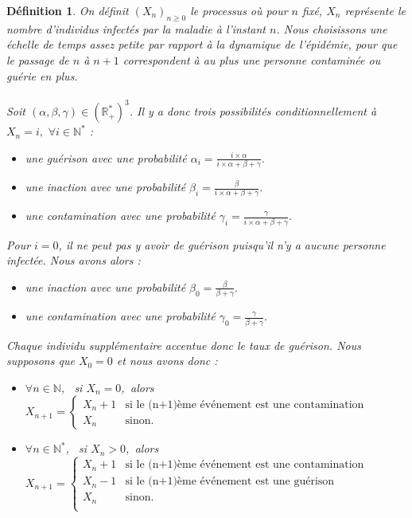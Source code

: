 \documentclass[12pt,a4paper]{report}
\newtheorem{definition}{Définition}[section]
\theoremstyle{remark}
\begin{document}
\begin{definition}
On définit $(X_n)_{n\geq0}$ le processus où pour $n$ fixé, $X_n$  représente le nombre d'individus infectés par la maladie à l'instant $n$. Nous choisissons une échelle de temps assez petite par rapport à la dynamique de l'épidémie, pour que le passage de $n$ à $n+1$ correspondent à au plus une personne contaminée ou guérie en plus.
\\
\\
Soit $(\alpha, \beta, \gamma) \in (\mathbb{R}_+^*)^3$. Il y a donc trois possibilités conditionnellement à $X_n = i, \, \, \forall i \in \mathbb{N}^*$ :  
\\
\begin{itemize}
\item une guérison avec une probabilité $\alpha_i=\frac{i \times \alpha}{i \times \alpha+\beta+\gamma}.$
\item une inaction avec une probabilité $\beta_i=\frac{\beta}{i \times \alpha+\beta+\gamma}.$
\item une contamination avec une probabilité $\gamma_i=\frac{\gamma}{i \times \alpha+\beta+\gamma}.$
\end{itemize}
\vspace{0.5cm}
Pour $i=0$, il ne peut pas y avoir de guérison puisqu'il n'y a aucune personne infectée. Nous avons alors :
\\
\begin{itemize}
\item une inaction avec une probabilité $\beta_0 = \frac{\beta}{\beta+\gamma}.$
\item une contamination avec une probabilité $\gamma_0=\frac{\gamma}{\beta+\gamma}.$
\end{itemize}
\vspace{0.5cm}

Chaque individu supplémentaire accentue donc le taux de guérison. Nous supposons que $X_{0} = 0$ et nous avons donc :
\\
\begin{itemize}
\item $\forall n \in \mathbb{N}$, \, si $X_n=0$,\, alors $X_{n+1} = \left\{
    \begin{array}{ll}
        X_n+1 & \mbox{si le (n+1)ème événement est une contamination } \\
        X_n & \mbox{sinon. }
    \end{array}
\right. $
\item $\forall n \in \mathbb{N}^*$, \, si $X_n > 0$,\, alors $X_{n+1} = \left\{
    \begin{array}{ll}
        X_n+1 & \mbox{si le (n+1)ème événement est une contamination} \\
        X_n-1 & \mbox{si le (n+1)ème événement est une guérison} \\
        X_n & \mbox{sinon. }\\
    \end{array}
\right. $
\end{itemize}
\end{definition}
\end{document}

